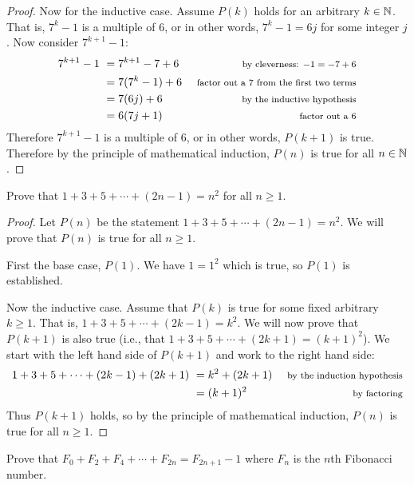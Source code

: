 \begin{questions}
\begin{answer}
\begin{proof}
		 Now for the inductive case.  Assume $P(k)$ holds for an arbitrary $k \in \mathbb N$.  That is, $7^k - 1$ is a multiple of 6, or in other words, $7^k - 1 = 6j$ for some integer $j$.  Now consider $7^{k+1} - 1$:
		 \begin{align*}
		  7^{k+1} - 1 ~ & = 7^{k+1} - 7 + 6 & \mbox{ \footnotesize by cleverness: $-1 = -7 + 6$}\\
		  & = 7(7^k - 1) + 6 & \mbox{ \footnotesize factor out a 7 from the first two terms}\\
		  & = 7(6j) + 6 & \mbox{ \footnotesize by the inductive hypothesis}\\
		  & = 6(7j + 1) & \mbox{ \footnotesize factor out a 6}
		 \end{align*}
		Therefore $7^{k+1} - 1$ is a multiple of 6, or in other words, $P(k+1)$ is true.  Therefore by the principle of mathematical induction, $P(n)$ is true for all $n \in \mathbb N$.
		\end{proof}
	\end{answer}
	
	
	

\question Prove that $1 + 3 + 5 + \cdots + (2n-1) = n^2$ for all $n \ge 1$.

	\begin{answer}
		\begin{proof}
		 Let $P(n)$ be the statement $1+3 +5 + \cdots + (2n-1) = n^2$.  We will prove that $P(n)$ is true for all $n \ge 1$.  
		 
		 First the base case, $P(1)$.  We have $ 1 = 1^2$ which is true, so $P(1)$ is established.
		 
		 Now the inductive case.  Assume that $P(k)$ is true for some fixed arbitrary $k \ge 1$.  That is, $1 + 3 + 5 + \cdots + (2k-1) = k^2$.  We will now prove that $P(k+1)$ is also true (i.e., that $1 + 3 + 5 + \cdots + (2k+1) = (k+1)^2$).  We start with the left hand side of $P(k+1)$ and work to the right hand side:
		 \begin{align*}
		  1 + 3 + 5 + \cdots + (2k-1) + (2k+1) ~ & = k^2 + (2k+1) & \mbox{ \footnotesize by the induction hypothesis}\\
		  & = (k+1)^2 & \mbox{ \footnotesize by factoring}
		 \end{align*}
		Thus $P(k+1)$ holds, so by the principle of mathematical induction, $P(n)$ is true for all $n \ge 1$.
		\end{proof}
	\end{answer}
	
	
	

\question Prove that $F_0 + F_2 + F_4 + \cdots + F_{2n} = F_{2n+1} - 1$ where $F_n$ is the $n$th Fibonacci number.


\end{questions}
